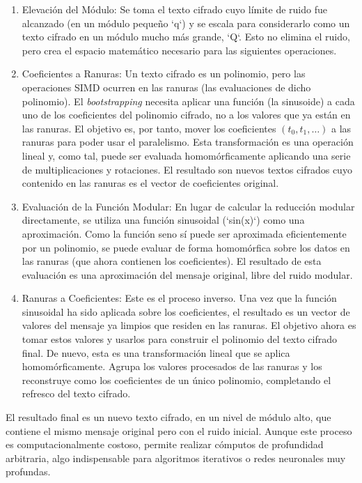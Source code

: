 \begin{enumerate}
    \item Elevación del Módulo: Se toma el texto cifrado cuyo límite de ruido fue alcanzado (en un módulo pequeño `q`) y se escala para considerarlo como un texto cifrado en un módulo mucho más grande, `Q`. Esto no elimina el ruido, pero crea el espacio matemático necesario para las siguientes operaciones.

    \item Coeficientes a Ranuras: Un texto cifrado es un polinomio, pero las operaciones SIMD ocurren en las ranuras (las evaluaciones de dicho polinomio). El \textit{bootstrapping} necesita aplicar una función (la sinusoide) a cada uno de los coeficientes del polinomio cifrado, no a los valores que ya están en las ranuras. El objetivo es, por tanto, mover los coeficientes $(t_0, t_1, \dots)$ a las ranuras para poder usar el paralelismo. Esta transformación es una operación lineal y, como tal, puede ser evaluada homomórficamente aplicando una serie de multiplicaciones y rotaciones. El resultado son nuevos textos cifrados cuyo contenido en las ranuras es el vector de coeficientes original.

    \item Evaluación de la Función Modular: En lugar de calcular la reducción modular directamente, se utiliza una función sinusoidal (`sin(x)`) como una aproximación. Como la función seno sí puede ser aproximada eficientemente por un polinomio, se puede evaluar de forma homomórfica sobre los datos en las ranuras (que ahora contienen los coeficientes). El resultado de esta evaluación es una aproximación del mensaje original, libre del ruido modular.

    \item Ranuras a Coeficientes: Este es el proceso inverso. Una vez que la función sinusoidal ha sido aplicada sobre los coeficientes, el resultado es un vector de valores del mensaje ya limpios que residen en las ranuras. El objetivo ahora es tomar estos valores y usarlos para construir el polinomio del texto cifrado final. De nuevo, esta es una transformación lineal que se aplica homomórficamente. Agrupa los valores procesados de las ranuras y los reconstruye como los coeficientes de un único polinomio, completando el refresco del texto cifrado.
\end{enumerate}

El resultado final es un nuevo texto cifrado, en un nivel de módulo alto, que contiene el mismo mensaje original pero con el ruido inicial. Aunque este proceso es computacionalmente costoso, permite realizar cómputos de profundidad arbitraria, algo indispensable para algoritmos iterativos o redes neuronales muy profundas.

